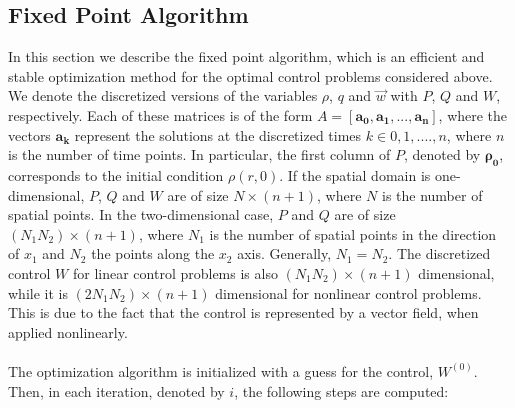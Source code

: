 \documentclass[11pt, a4paper]{article}
\theoremstyle{definition}
\newcommand{\adj}{q}
\begin{document}
\subsection{Fixed Point Algorithm}\label{sec:Method_SolverFP}
In this section we describe the fixed point algorithm, which is an efficient and stable optimization method for the optimal control problems considered above. 
We denote the discretized versions of the variables $\rho$, $\adj$ and $\vec{w}$ with $P$, $Q$ and $W$, respectively. Each of these matrices is of the form $A = [\boldsymbol{a_0}, \boldsymbol{a_1}, ... ,\boldsymbol{a_n}]$, where the vectors $\boldsymbol{a_k}$ represent the solutions at the discretized times $k \in 0,1,....,n$, where $n$ is the number of time points. In particular, the first column of $P$, denoted by $\boldsymbol{\rho_0}$, corresponds to the initial condition $\rho(r,0)$. If the spatial domain is one-dimensional, $P$, $Q$ and $W$ are of size $N \times (n + 1)$, where $N$ is the number of spatial points. In the two-dimensional case, $P$ and $Q$ are of size $(N_1N_2) \times (n + 1)$, where $N_1$ is the number of spatial points in the direction of $x_1$ and $N_2$ the points along the $x_2$ axis. Generally, $N_1 = N_2$. The discretized control $W$ for linear control problems is also $(N_1N_2) \times (n + 1)$ dimensional, while it is $(2N_1N_2) \times (n + 1)$ dimensional for nonlinear control problems. This is due to the fact that the control is represented by a vector field, when applied nonlinearly.
\\
\\
The optimization algorithm is initialized with a guess for the control, $W^{(0)}$. Then, in each iteration, denoted by $i$, the following steps are computed:
\vspace{0.1cm}
\end{document}
